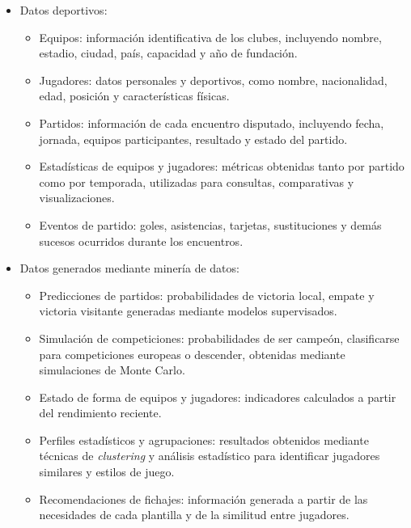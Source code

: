 \begin{itemize}

    \item Datos deportivos:
    \begin{itemize}
        \item Equipos: información identificativa de los clubes, incluyendo nombre, estadio, ciudad, país, capacidad y año de fundación.

        \item Jugadores: datos personales y deportivos, como nombre, nacionalidad, edad, posición y características físicas.

        \item Partidos: información de cada encuentro disputado, incluyendo fecha, jornada, equipos participantes, resultado y estado del partido.

        \item Estadísticas de equipos y jugadores: métricas obtenidas tanto por partido como por temporada, utilizadas para consultas, comparativas y visualizaciones.

        \item Eventos de partido: goles, asistencias, tarjetas, sustituciones y demás sucesos ocurridos durante los encuentros.
    \end{itemize}

    \item Datos generados mediante minería de datos:
    \begin{itemize}
        \item Predicciones de partidos: probabilidades de victoria local, empate y victoria visitante generadas mediante modelos supervisados.

        \item Simulación de competiciones: probabilidades de ser campeón, clasificarse para competiciones europeas o descender, obtenidas mediante simulaciones de Monte Carlo.

        \item Estado de forma de equipos y jugadores: indicadores calculados a partir del rendimiento reciente.

        \item Perfiles estadísticos y agrupaciones: resultados obtenidos mediante técnicas de \textit{clustering} y análisis estadístico para identificar jugadores similares y estilos de juego.

        \item Recomendaciones de fichajes: información generada a partir de las necesidades de cada plantilla y de la similitud entre jugadores.
    \end{itemize}


\end{itemize}
